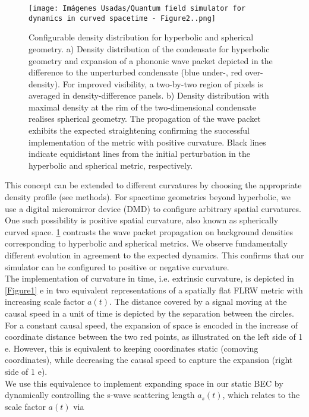 \documentclass[11pt,twocolumn,letterpaper]{article}
\newcounter{ns}
\begin{document}
\begin{figure}[ht]
    \centering
    \texttt{[image: Imágenes Usadas/Quantum field simulator for dynamics in curved spacetime - Figure2..png]}
    \caption{Configurable density distribution for hyperbolic and spherical geometry. a) Density distribution of the condensate for hyperbolic geometry and expansion of a phononic wave packet depicted in the difference to the unperturbed condensate (blue under-, red over-density). For improved visibility, a two-by-two region of pixels is averaged in density-difference panels. b) Density distribution with maximal density at the rim of the two-dimensional condensate realises spherical geometry. The propagation of the wave packet exhibits the expected straightening confirming the successful implementation of the metric with positive curvature. Black lines indicate equidistant lines from the initial perturbation in the hyperbolic and spherical metric, respectively.
}
    \label{Figure2}
\end{figure}

This concept can be extended to different curvatures by choosing the appropriate density profile (see methods). For spacetime geometries beyond hyperbolic, we use a digital micromirror device (DMD) \cite{Lb.5, Lb.6} to configure arbitrary spatial curvatures. One such possibility is positive spatial curvature, also known as spherically curved space. \ref{Figure2} contrasts the wave packet propagation on background densities corresponding to hyperbolic and spherical metrics. We observe fundamentally different evolution in agreement to the expected dynamics. This confirms that our simulator can be configured to positive or negative curvature.\\

The implementation of curvature in time, i.e. extrinsic curvature, is depicted in \ref{Figure1} e in two equivalent representations of a spatially flat FLRW metric with increasing scale factor $a(t)$. The distance covered by a signal moving at the causal speed in a unit of time is depicted by the separation between the circles. For a constant causal speed, the expansion of space is encoded in the increase of coordinate distance between the two red points, as illustrated on the left side of 1 e. However, this is equivalent to keeping coordinates static (comoving coordinates), while decreasing the causal speed to capture
the expansion (right side of 1 e).\\

We use this equivalence to implement expanding space in our static BEC by dynamically controlling the s-wave scattering length $a_{s}(t)$, which relates to the scale factor $a(t)$ via
\end{document}

